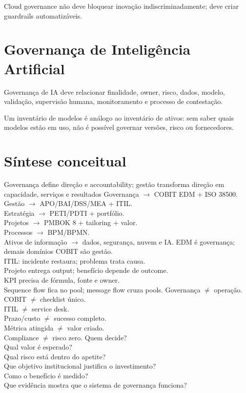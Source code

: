 Cloud governance não deve bloquear inovação indiscriminadamente; deve criar guardrails automatizáveis.

\section{Governança de Inteligência Artificial}

Governança de IA deve relacionar finalidade, owner, risco, dados, modelo, validação, supervisão humana, monitoramento e processo de contestação.

Um inventário de modelos é análogo ao inventário de ativos: sem saber quais modelos estão em uso, não é possível governar versões, risco ou fornecedores.

\section{Síntese conceitual}

{Governança define direção e accountability; gestão transforma direção em capacidade, serviços e resultados}
{Governança $\rightarrow$ COBIT EDM + ISO 38500.\\Gestão $\rightarrow$ APO/BAI/DSS/MEA + ITIL.\\Estratégia $\rightarrow$ PETI/PDTI + portfólio.\\Projetos $\rightarrow$ PMBOK 8 + tailoring + valor.\\Processos $\rightarrow$ BPM/BPMN.\\Ativos de informação $\rightarrow$ dados, segurança, nuvem e IA.}
{EDM é governança; demais domínios COBIT são gestão.\\ITIL: incidente restaura; problema trata causa.\\Projeto entrega output; benefício depende de outcome.\\KPI precisa de fórmula, fonte e owner.\\Sequence flow fica no pool; message flow cruza pools.}
{Governança $\neq$ operação.\\COBIT $\neq$ checklist único.\\ITIL $\neq$ service desk.\\Prazo/custo $\neq$ sucesso completo.\\Métrica atingida $\neq$ valor criado.\\Compliance $\neq$ risco zero.}
{Quem decide?\\Qual valor é esperado?\\Qual risco está dentro do apetite?\\Que objetivo institucional justifica o investimento?\\Como o benefício é medido?\\Que evidência mostra que o sistema de governança funciona?}

